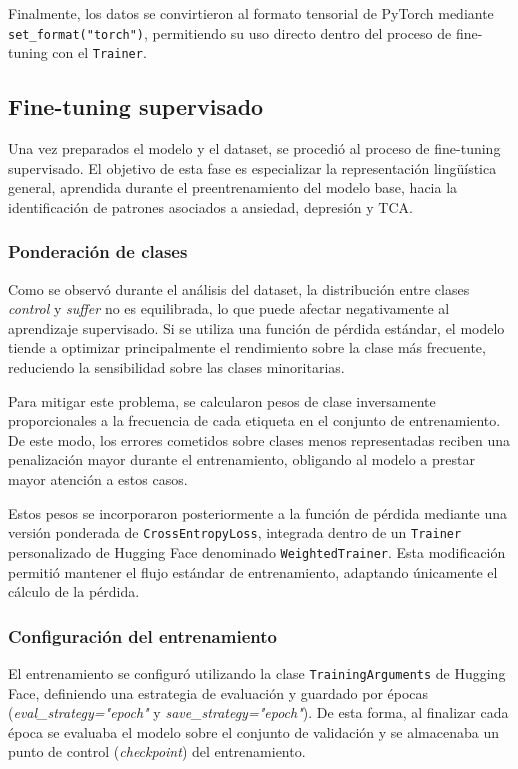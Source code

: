 Finalmente, los datos se convirtieron al formato tensorial de PyTorch \cite{paszke_pytorch_2019} mediante \texttt{set\_format("torch")}, permitiendo su uso directo dentro del proceso de fine-tuning con el \texttt{Trainer}.

\subsection{Fine-tuning supervisado}

Una vez preparados el modelo y el dataset, se procedió al proceso de fine-tuning supervisado. El objetivo de esta fase es especializar la representación lingüística general, aprendida durante el preentrenamiento del modelo base, hacia la identificación de patrones asociados a ansiedad, depresión y \ac{TCA}.

\subsubsection{Ponderación de clases}

Como se observó durante el análisis del dataset, la distribución entre clases \textit{control} y \textit{suffer} no es equilibrada, lo que puede afectar negativamente al aprendizaje supervisado. Si se utiliza una función de pérdida estándar, el modelo tiende a optimizar principalmente el rendimiento sobre la clase más frecuente, reduciendo la sensibilidad sobre las clases minoritarias.

Para mitigar este problema, se calcularon pesos de clase inversamente proporcionales a la frecuencia de cada etiqueta en el conjunto de entrenamiento. De este modo, los errores cometidos sobre clases menos representadas reciben una penalización mayor durante el entrenamiento, obligando al modelo a prestar mayor atención a estos casos.

Estos pesos se incorporaron posteriormente a la función de pérdida mediante una versión ponderada de \texttt{CrossEntropyLoss}, integrada dentro de un \texttt{Trainer} personalizado de Hugging Face denominado \texttt{WeightedTrainer}. Esta modificación permitió mantener el flujo estándar de entrenamiento, adaptando únicamente el cálculo de la pérdida.

\subsubsection{Configuración del entrenamiento}

El entrenamiento se configuró utilizando la clase \texttt{TrainingArguments} de Hugging Face, definiendo una estrategia de evaluación y guardado por épocas (\textit{eval\_strategy="epoch"} y \textit{save\_strategy="epoch"}). De esta forma, al finalizar cada época se evaluaba el modelo sobre el conjunto de validación y se almacenaba un punto de control (\textit{checkpoint}) del entrenamiento.

